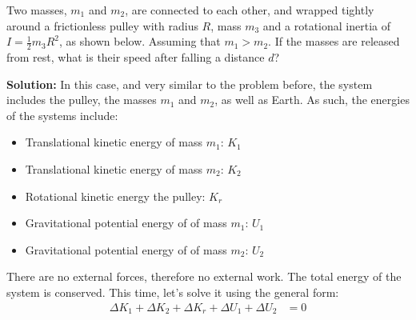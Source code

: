\begin{example}
  Two masses, $m_1$ and $m_2$, are connected to each other, and wrapped tightly
  around a frictionless pulley with radius $R$, mass $m_3$ and a rotational
  inertia of $I=\frac12m_3R^2$, as shown below. Assuming that $m_1>m_2$. If the
  masses are released from rest, what is their speed after falling a distance
  $d$?
  \begin{center}
  \end{center}
  \vspace{.2in}\textbf{Solution:} In this case, and very similar to the
  problem before, the system includes the pulley, the masses $m_1$ and $m_2$,
  as well as Earth. As such, the energies of the systems include:
  \begin{itemize}
  \item Translational kinetic energy of mass $m_1$: $K_1$
  \item Translational kinetic energy of mass $m_2$: $K_2$
  \item Rotational kinetic energy the pulley: $K_r$
  \item Gravitational potential energy of of mass $m_1$: $U_1$
  \item Gravitational potential energy of of mass $m_2$: $U_2$
  \end{itemize}
  There are no external forces, therefore no external work. The total energy
  of the system is conserved. This time, let's solve it using the general form:
  \begin{align*}
    \Delta K_1 + \Delta K_2 + \Delta K_r + \Delta U_1 + \Delta U_2  &= 0\\

\end{align*}
\end{example}
